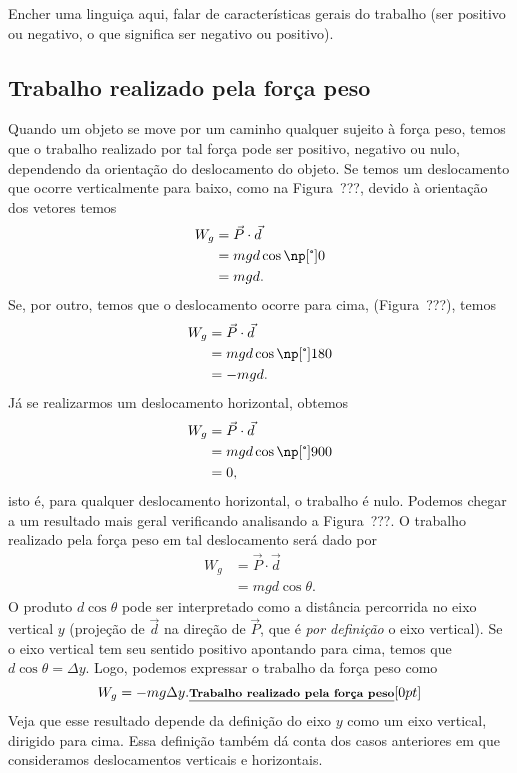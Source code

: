 Encher uma linguiça aqui, falar de características gerais do trabalho (ser positivo ou negativo, o que significa ser negativo ou positivo).

\subsection{Trabalho realizado pela força peso}

Quando um objeto se move por um caminho qualquer sujeito à força peso, temos que o trabalho realizado por tal força pode ser positivo, negativo ou nulo, dependendo da orientação do deslocamento do objeto. Se temos um deslocamento que ocorre verticalmente para baixo, como na Figura~???, devido à orientação dos vetores temos
\begin{align}
  W_g &= \vec{P}\cdot\vec{d} \\
  &= mgd\cos\degree{0} \\
  &= mgd.
\end{align}
%
Se, por outro, temos que o deslocamento ocorre para cima, (Figura~???), temos
\begin{align}
  W_g &= \vec{P}\cdot\vec{d} \\
  &= mgd\cos\degree{180} \\
  &= -mgd.
\end{align}
%
Já se realizarmos um deslocamento horizontal, obtemos
\begin{align}
  W_g &= \vec{P}\cdot\vec{d} \\
  &= mgd\cos\degree{900} \\
  &= 0,
\end{align}
%
isto é, para qualquer deslocamento horizontal, o trabalho é nulo. Podemos chegar a um resultado mais geral verificando analisando a Figura~???. 
O trabalho realizado pela força peso em tal deslocamento será dado por
\begin{align}
  W_g &= \vec{P}\cdot\vec{d} \\
  &= mgd\cos\theta.
\end{align}
%
O produto $d\cos\theta$ pode ser interpretado como a distância percorrida no eixo vertical $y$ (projeção de $\vec{d}$ na direção de $\vec{P}$, que é \emph{por definição} o eixo vertical). Se o eixo vertical tem seu sentido positivo apontando para cima, temos que $d\cos\theta = \Delta y$. Logo, podemos expressar o trabalho da força peso como
\begin{equation}\label{Eq:TrabalhoPeso}
  W_g = - mg\Delta y. \relax{\footnotesize\emph{\textbf{Trabalho realizado pela força peso}}}[0pt]
\end{equation}
%
Veja que esse resultado depende da definição do eixo $y$ como um eixo vertical, dirigido para cima. Essa definição também dá conta dos casos anteriores em que consideramos deslocamentos verticais e horizontais.
  
